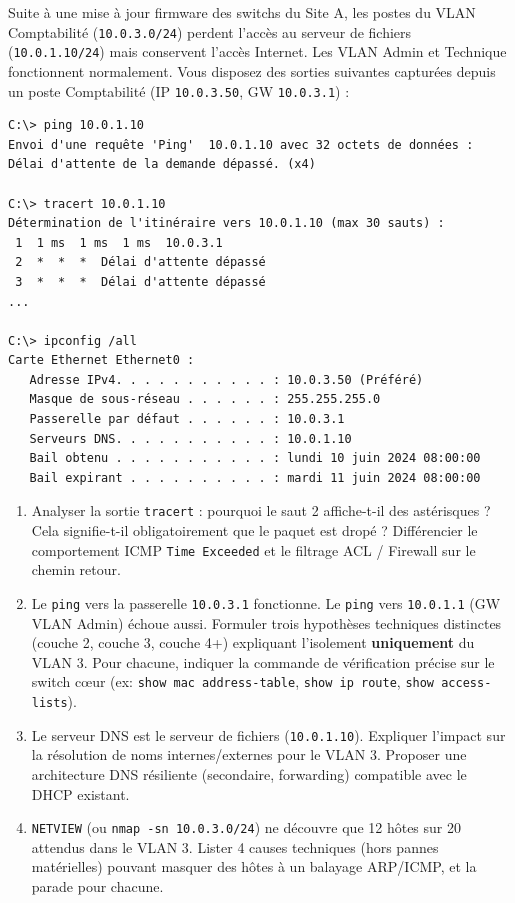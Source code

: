\documentclass[11pt]{article}
\begin{document}
\begin{exercice}
Suite à une mise à jour firmware des switchs du Site A, les postes du VLAN Comptabilité (\texttt{10.0.3.0/24}) perdent l'accès au serveur de fichiers (\texttt{10.0.1.10/24}) mais conservent l'accès Internet. Les VLAN Admin et Technique fonctionnent normalement. Vous disposez des sorties suivantes capturées depuis un poste Comptabilité (IP \texttt{10.0.3.50}, GW \texttt{10.0.3.1}) :

\begin{verbatim}
C:\> ping 10.0.1.10
Envoi d'une requête 'Ping'  10.0.1.10 avec 32 octets de données :
Délai d'attente de la demande dépassé. (x4)

C:\> tracert 10.0.1.10
Détermination de l'itinéraire vers 10.0.1.10 (max 30 sauts) :
 1  1 ms  1 ms  1 ms  10.0.3.1
 2  *  *  *  Délai d'attente dépassé
 3  *  *  *  Délai d'attente dépassé
...

C:\> ipconfig /all
Carte Ethernet Ethernet0 :
   Adresse IPv4. . . . . . . . . . . : 10.0.3.50 (Préféré)
   Masque de sous-réseau . . . . . . : 255.255.255.0
   Passerelle par défaut . . . . . . : 10.0.3.1
   Serveurs DNS. . . . . . . . . . . : 10.0.1.10
   Bail obtenu . . . . . . . . . . . : lundi 10 juin 2024 08:00:00
   Bail expirant . . . . . . . . . . : mardi 11 juin 2024 08:00:00
\end{verbatim}

\begin{enumerate}
    \item Analyser la sortie \texttt{tracert} : pourquoi le saut 2 affiche-t-il des astérisques ? Cela signifie-t-il obligatoirement que le paquet est dropé ? Différencier le comportement ICMP \texttt{Time Exceeded} et le filtrage ACL / Firewall sur le chemin retour.
    \item Le \texttt{ping} vers la passerelle \texttt{10.0.3.1} fonctionne. Le \texttt{ping} vers \texttt{10.0.1.1} (GW VLAN Admin) échoue aussi. Formuler trois hypothèses techniques distinctes (couche 2, couche 3, couche 4+) expliquant l'isolement \textbf{uniquement} du VLAN 3. Pour chacune, indiquer la commande de vérification précise sur le switch cœur (ex: \texttt{show mac address-table}, \texttt{show ip route}, \texttt{show access-lists}).
    \item Le serveur DNS est le serveur de fichiers (\texttt{10.0.1.10}). Expliquer l'impact sur la résolution de noms internes/externes pour le VLAN 3. Proposer une architecture DNS résiliente (secondaire, forwarding) compatible avec le DHCP existant.
    \item \texttt{NETVIEW} (ou \texttt{nmap -sn 10.0.3.0/24}) ne découvre que 12 hôtes sur 20 attendus dans le VLAN 3. Lister 4 causes techniques (hors pannes matérielles) pouvant masquer des hôtes à un balayage ARP/ICMP, et la parade pour chacune.
\end{enumerate}
\end{exercice}
\end{document}

